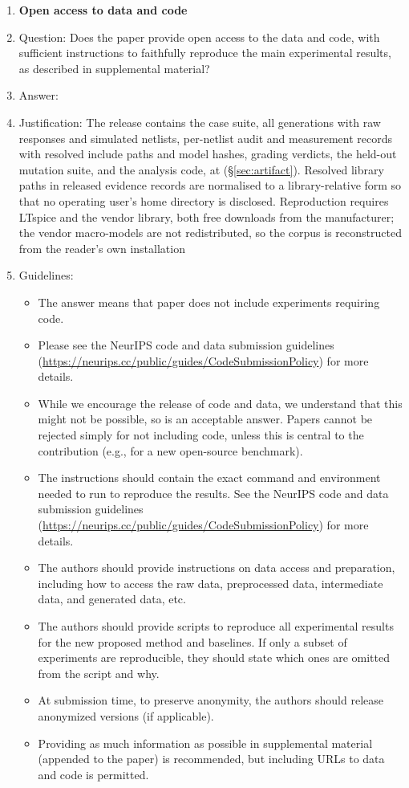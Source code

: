 \begin{enumerate}
\item {\bf Open access to data and code}
    \item[] Question: Does the paper provide open access to the data and code, with sufficient instructions to faithfully reproduce the main experimental results, as described in supplemental material?
       \item[] Answer: \answerYes{}
    \item[] Justification: The release contains the case suite, all
    \CorpusTotal{} generations with raw responses and simulated netlists,
    per-netlist audit and measurement records with resolved include paths and
    model hashes, grading verdicts, the held-out mutation suite, and the
    analysis code, at \artifacturl{} (\S\ref{sec:artifact}). Resolved library
    paths in released evidence records are normalised to a library-relative
    form so that no operating user's home directory is disclosed. Reproduction
    requires LTspice and the vendor library, both free downloads from the
    manufacturer; the vendor macro-models are not redistributed, so the corpus
    is reconstructed from the reader's own installation
    \item[] Guidelines:
    \begin{itemize}
        \item The answer \answerNA{} means that paper does not include experiments requiring code.
        \item Please see the NeurIPS code and data submission guidelines (\url{https://neurips.cc/public/guides/CodeSubmissionPolicy}) for more details.
        \item While we encourage the release of code and data, we understand that this might not be possible, so \answerNo{} is an acceptable answer. Papers cannot be rejected simply for not including code, unless this is central to the contribution (e.g., for a new open-source benchmark).
        \item The instructions should contain the exact command and environment needed to run to reproduce the results. See the NeurIPS code and data submission guidelines (\url{https://neurips.cc/public/guides/CodeSubmissionPolicy}) for more details.
        \item The authors should provide instructions on data access and preparation, including how to access the raw data, preprocessed data, intermediate data, and generated data, etc.
        \item The authors should provide scripts to reproduce all experimental results for the new proposed method and baselines. If only a subset of experiments are reproducible, they should state which ones are omitted from the script and why.
        \item At submission time, to preserve anonymity, the authors should release anonymized versions (if applicable).
        \item Providing as much information as possible in supplemental material (appended to the paper) is recommended, but including URLs to data and code is permitted.
    \end{itemize}



\end{enumerate}
